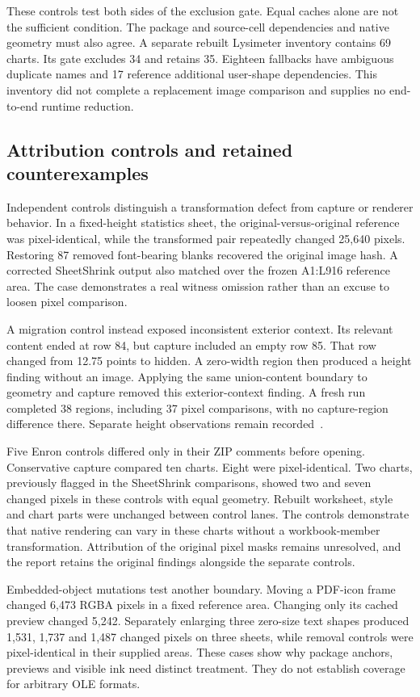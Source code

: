 These controls test both sides of the exclusion gate. Equal caches alone are
not the sufficient condition. The package and source-cell dependencies and
native geometry must also agree. A separate rebuilt Lysimeter inventory contains
69 charts. Its gate excludes 34 and retains 35. Eighteen fallbacks have ambiguous
duplicate names and 17 reference additional user-shape dependencies. This
inventory did not complete a replacement image comparison and supplies no
end-to-end runtime reduction.

\subsection{Attribution controls and retained counterexamples}
Independent controls distinguish a transformation defect from capture or renderer
behavior. In a fixed-height statistics sheet, the original-versus-original
reference was pixel-identical, while the transformed pair repeatedly changed
25,640 pixels. Restoring 87 removed font-bearing blanks recovered the original
image hash. A corrected SheetShrink output also matched over the frozen
A1:L916 reference area. The case demonstrates a real witness omission rather
than an excuse to loosen pixel comparison.

A migration control instead exposed inconsistent exterior context. Its relevant
content ended at row 84, but capture included an empty row 85. That row changed
from 12.75 points to hidden. A zero-width region then produced a height finding
without an image. Applying the same union-content boundary to geometry and
capture removed this exterior-context finding. A fresh run completed 38 regions,
including 37 pixel comparisons, with no capture-region difference there. Separate
height observations remain recorded~\cite{trailingrowvalidation}.

Five Enron controls differed only in their ZIP comments before opening.
Conservative capture compared ten charts. Eight were pixel-identical.
Two charts, previously flagged in the SheetShrink comparisons, showed two
and seven changed pixels in these controls with equal geometry. Rebuilt
worksheet, style and chart parts were unchanged between control lanes.
The controls demonstrate that native rendering can vary in these charts
without a workbook-member transformation. Attribution of the original
pixel masks remains unresolved, and the report retains the original
findings alongside the separate controls.

Embedded-object mutations test another boundary. Moving a PDF-icon frame changed
6,473 RGBA pixels in a fixed reference area. Changing only its cached preview
changed 5,242. Separately enlarging three zero-size text shapes produced 1,531,
1,737 and 1,487 changed pixels on three sheets, while removal controls were
pixel-identical in their supplied areas. These cases show why package anchors,
previews and visible ink need distinct treatment. They do not establish coverage
for arbitrary OLE formats.

